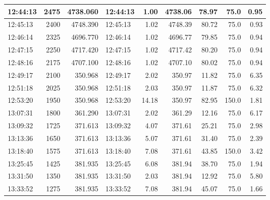 \begin{table}[ht!]
\begin{adjustbox}{max width=\textwidth}
\begin{tabular}{|l|r|r|l|r|r|r|r|r|}
12:44:13 &               2475 &        4738.060 & 12:44:13 &       1.00 &        4738.06 &   78.97 &             75.0 & 0.95 \\ \hline
12:45:13 &               2400 &        4748.390 & 12:45:13 &       1.02 &        4748.39 &   80.72 &             75.0 & 0.93 \\ \hline
12:46:14 &               2325 &        4696.770 & 12:46:14 &       1.02 &        4696.77 &   79.85 &             75.0 & 0.94 \\ \hline
12:47:15 &               2250 &        4717.420 & 12:47:15 &       1.02 &        4717.42 &   80.20 &             75.0 & 0.94 \\ \hline
12:48:16 &               2175 &        4707.100 & 12:48:16 &       1.02 &        4707.10 &   80.02 &             75.0 & 0.94 \\ \hline
12:49:17 &               2100 &         350.968 & 12:49:17 &       2.02 &         350.97 &   11.82 &             75.0 & 6.35 \\ \hline
12:51:18 &               2025 &         350.968 & 12:51:18 &       2.03 &         350.97 &   11.87 &             75.0 & 6.32 \\ \hline
12:53:20 &               1950 &         350.968 & 12:53:20 &      14.18 &         350.97 &   82.95 &            150.0 & 1.81 \\ \hline
13:07:31 &               1800 &         361.290 & 13:07:31 &       2.02 &         361.29 &   12.16 &             75.0 & 6.17 \\ \hline
13:09:32 &               1725 &         371.613 & 13:09:32 &       4.07 &         371.61 &   25.21 &             75.0 & 2.98 \\ \hline
13:13:36 &               1650 &         371.613 & 13:13:36 &       5.07 &         371.61 &   31.40 &             75.0 & 2.39 \\ \hline
13:18:40 &               1575 &         371.613 & 13:18:40 &       7.08 &         371.61 &   43.85 &            150.0 & 3.42 \\ \hline
13:25:45 &               1425 &         381.935 & 13:25:45 &       6.08 &         381.94 &   38.70 &             75.0 & 1.94 \\ \hline
13:31:50 &               1350 &         381.935 & 13:31:50 &       2.03 &         381.94 &   12.92 &             75.0 & 5.80 \\ \hline
13:33:52 &               1275 &         381.935 & 13:33:52 &       7.08 &         381.94 &   45.07 &             75.0 & 1.66 \\ \hline

\end{tabular}
\end{adjustbox}
\end{table}
